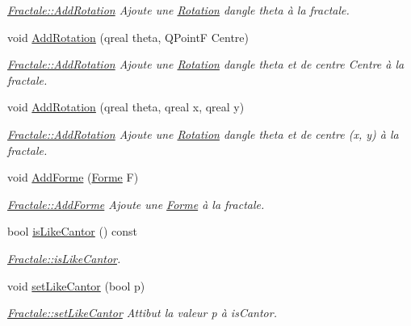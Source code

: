 \begin{DoxyCompactItemize}
\begin{DoxyCompactList}\small\item\em \hyperlink{class_fractale_a2a222da66f021b2cdd63d67f9ec0fb90}{Fractale\+::\+Add\+Rotation} Ajoute une \hyperlink{class_rotation}{Rotation} d\textquotesingle{}angle theta à la fractale. \end{DoxyCompactList}\item 
void \hyperlink{class_fractale_a42e1fb35570d1a2a29ab18fbe1c66228}{Add\+Rotation} (qreal theta, Q\+Point\+F Centre)
\begin{DoxyCompactList}\small\item\em \hyperlink{class_fractale_a2a222da66f021b2cdd63d67f9ec0fb90}{Fractale\+::\+Add\+Rotation} Ajoute une \hyperlink{class_rotation}{Rotation} d\textquotesingle{}angle theta et de centre Centre à la fractale. \end{DoxyCompactList}\item 
void \hyperlink{class_fractale_a3482fb8617cdc1002a0b1b6b94d0cb18}{Add\+Rotation} (qreal theta, qreal x, qreal y)
\begin{DoxyCompactList}\small\item\em \hyperlink{class_fractale_a2a222da66f021b2cdd63d67f9ec0fb90}{Fractale\+::\+Add\+Rotation} Ajoute une \hyperlink{class_rotation}{Rotation} d\textquotesingle{}angle theta et de centre (x, y) à la fractale. \end{DoxyCompactList}\item 
void \hyperlink{class_fractale_a558ed8b360dcd396321ddd4c6b18aed3}{Add\+Forme} (\hyperlink{class_forme}{Forme} F)
\begin{DoxyCompactList}\small\item\em \hyperlink{class_fractale_a558ed8b360dcd396321ddd4c6b18aed3}{Fractale\+::\+Add\+Forme} Ajoute une \hyperlink{class_forme}{Forme} à la fractale. \end{DoxyCompactList}\item 
bool \hyperlink{class_fractale_a8a3f226eb475bb5645a81b3342a6c00d}{is\+Like\+Cantor} () const 
\begin{DoxyCompactList}\small\item\em \hyperlink{class_fractale_a8a3f226eb475bb5645a81b3342a6c00d}{Fractale\+::is\+Like\+Cantor}. \end{DoxyCompactList}\item 
void \hyperlink{class_fractale_a14d1e1b757de8d3cbfb227d50c2dbd4c}{set\+Like\+Cantor} (bool p)
\begin{DoxyCompactList}\small\item\em \hyperlink{class_fractale_a14d1e1b757de8d3cbfb227d50c2dbd4c}{Fractale\+::set\+Like\+Cantor} Attibut la valeur p à is\+Cantor. \end{DoxyCompactList}\item 

\end{DoxyCompactItemize}
